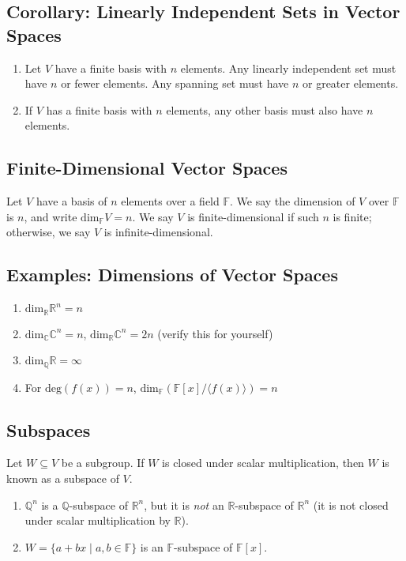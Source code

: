 \documentclass[8pt]{extarticle}
\newcommand{\Q}{\mathbb{Q}}
\newcommand{\R}{\mathbb{R}}
\newcommand{\C}{\mathbb{C}}
\begin{document}
  \subsection{Corollary: Linearly Independent Sets in Vector Spaces}%
  \begin{enumerate}[(1)]
    \item Let $V$ have a finite basis with $n$ elements. Any linearly independent set must have $n$ or fewer elements. Any spanning set must have $n$ or greater elements.
    \item If $V$ has a finite basis with $n$ elements, any other basis must also have $n$ elements.
  \end{enumerate}
  \subsection{Finite-Dimensional Vector Spaces}%
  Let $V$ have a basis of $n$ elements over a field $\mathbb{F}$. We say the dimension of $V$ over $\mathbb{F}$ is $n$, and write $\text{dim}_{\mathbb{F}}V = n$. We say $V$ is finite-dimensional if such $n$ is finite; otherwise, we say $V$ is infinite-dimensional.
  \subsection{Examples: Dimensions of Vector Spaces}%
  \begin{enumerate}[(1)]
    \item $\text{dim}_{\R}\R^{n} = n$
    \item $\text{dim}_{\C}\C^{n} = n$, $\text{dim}_{\R}\C^{n} = 2n$ (verify this for yourself)
    \item $\text{dim}_{\Q}\R = \infty$
    \item For $\text{deg}(f(x)) = n$, $\text{dim}_{\mathbb{F}}(\mathbb{F}[x]/\langle f(x) \rangle) = n$
  \end{enumerate}
  \subsection{Subspaces}%
  Let $W\subseteq V$ be a subgroup. If $W$ is closed under scalar multiplication, then $W$ is known as a subspace of $V$.
  \begin{enumerate}[(1)]
    \item $\Q^{n}$ is a $\Q$-subspace of $\R^n$, but it is \textit{not} an $\R$-subspace of $\R^n$ (it is not closed under scalar multiplication by $\R$).
    \item $W = \{a+bx\mid a,b\in\mathbb{F}\}$ is an $\mathbb{F}$-subspace of $\mathbb{F}[x]$.
  \end{enumerate}
\end{document}

